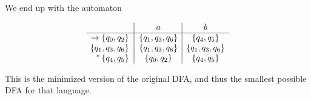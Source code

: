 \documentclass{article}
\begin{document}
We end up with the automaton

\begin{align*}
\centering
    \begin{array}{r || c | c}
        & a & b \\ \hline
        \to \set{q_0, q_2} & \set{q_1,q_3,q_6} & \set{q_4, q_5} \\
        \set{q_1,q_3,q_6}  & \set{q_1,q_3,q_6} &\set{q_1,q_3,q_6} \\
        ^*\set{q_4, q_5} & \set{q_0, q_2} & \set{q_4, q_5}
    \end{array}
\end{align*}

This is the minimized version of the original DFA, and thus the smallest possible DFA for that language.
\end{document}
